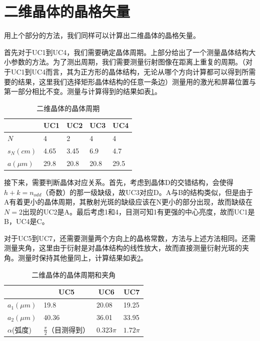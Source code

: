 \documentclass[fleqn,10pt]{SelfArx} %
\begin{document}
\section{二维晶体的晶格矢量}

用上个部分的方法，我们同样可以计算出二维晶体的晶格矢量。

首先对于UC1到UC4，我们需要确定晶体周期。上部分给出了一个测量晶体结构大小参数的方法。为了测出周期，我们需要测量衍射图像在距离上重复的周期。（对于UC1到UC4而言，其为正方形的晶体结构，无论从哪个方向计算都可以得到所需要的结果，这里我们选择矩形晶体结构的任意一条边）测量用的激光和屏幕位置与第一部分相比不变。测量与计算得到的结果如表\ref{tab:3}。
\begin{table}[htbp]
\centering
\begin{tabular}{|l|l|l|l|l|}
\hline
\multicolumn{1}{|c|}{\textbf{}} &
  \multicolumn{1}{c|}{\textbf{UC1}} &
  \multicolumn{1}{c|}{\textbf{UC2}} &
  \multicolumn{1}{c|}{\textbf{UC3}} &
  \multicolumn{1}{c|}{\textbf{UC4}} \\ \hline
$N$        & 4    & 2    & 4    & 4    \\ \hline
$s_N(cm)$  & 4.65 & 3.45 & 6.9  & 4.7  \\ \hline
$a(\mu m)$ & 29.8 & 20.8 & 20.8 & 29.5 \\ \hline
\end{tabular}
\caption{二维晶体的晶体周期}
\label{tab:3}
\end{table}
接下来，需要判断晶体对应关系。首先，考虑到晶体D的交错结构，会使得$h+k=n_{odd}$（奇数）的那一级缺级，故UC3对应D。A与B的结构类似，但是由于A有着更小的晶体周期，其散射光斑的缺级应该在N更小的部分出现，故而缺级在$N=2$出现的UC2是A。最后考虑1和4，目测可知1有更强的中心亮度，故而UC1是B，UC4是C。

对于UC5到UC7，还需要测量两个方向上的晶格常数，方法与上述方法相同。还需测量夹角，这里由于衍射是对晶体结构的线性放大，故而直接测量衍射光斑的夹角。测量时保持其他量同上，计算结果如表\ref{tab:4}。
\begin{table}[htbp]
\centering
\begin{tabular}{|l|l|l|l|}
\hline
\multicolumn{1}{|c|}{\textbf{}} & \multicolumn{1}{c|}{\textbf{UC5}} & \multicolumn{1}{c|}{\textbf{UC6}} & \multicolumn{1}{c|}{\textbf{UC7}} \\ \hline
$a_1(\mu m)$ & 19.8                  & 20.08      & 19.25     \\ \hline
$a_2(\mu m)$ & 40.36                 & 36.01      & 33.95     \\ \hline
$\alpha$(弧度) & $\frac{\pi}{2}$（目测得到） & $0.323\pi$ & $1.72\pi$ \\ \hline
\end{tabular}
\caption{二维晶体的晶体周期和夹角}
\label{tab:4}
\end{table}
\end{document}

